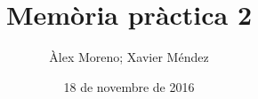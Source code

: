 \documentclass[catalan,parskip=half*,twoside,DIV=12,BCOR=17mm,hidelinks]{scrbook}
\gdef\accumcontent{}
\newcommand{\dumpaccum}{\accumcontent \gdef\accumcontent{}}
\let\myTOC\tableofcontents
\renewcommand\tableofcontents{%
  \pdfbookmark[1]{\contentsname}{}
  \myTOC }
\begin{document}
\title{Memòria pràctica 2}
\date{18 de novembre de 2016}
\author{Àlex Moreno; Xavier Méndez}

\maketitle

\tableofcontents
\clearpage


\newcommand{\cclearpage}{}
\newcommand{\projectname}{}
\newcommand{\inputproject}[1]{
  \dumpaccum
  \renewcommand{\projectname}{#1}
  
}
\inputproject{2}
\inputproject{2-extra1}
\inputproject{2-extra2}
\inputproject{2-extra3}
\dumpaccum
\appendix
\inputproject{2-extra4}
\end{document}
